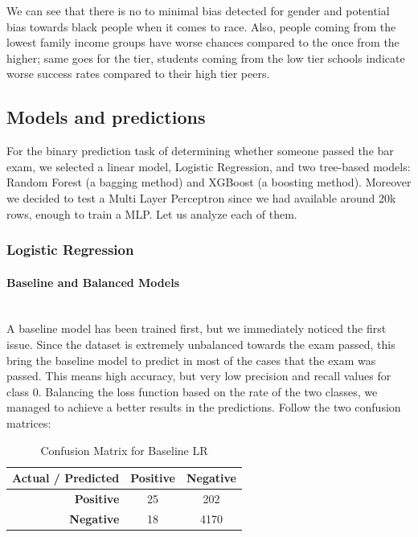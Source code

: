 \documentclass{article}
\begin{document}
We can see that there is no to minimal bias detected for gender and potential bias towards black people when it comes to race. Also, people coming from the lowest family income groups have worse chances compared to the once from the higher; same goes for the tier, students coming from the low tier schools indicate worse success rates compared to their high tier peers.
\subsection{Models and predictions}
For the binary prediction task of determining whether someone passed the bar exam, we selected a linear model, Logistic Regression, and two tree-based models: Random Forest (a bagging method) and XGBoost (a boosting method). Moreover we decided to test a Multi Layer Perceptron since we had available around 20k rows, enough to train a MLP. Let us analyze each of them.
\subsubsection{Logistic Regression}
\paragraph{Baseline and Balanced Models}\mbox{}\\
A baseline model has been trained first, but we immediately noticed the first issue. Since the dataset is extremely unbalanced towards the exam passed, this bring the baseline model to predict in most of the cases that the exam was passed. This means high accuracy, but very low precision and recall values for class 0. Balancing the loss function based on the rate of the two classes, we managed to achieve a better results in the predictions. Follow the two confusion matrices:
\begin{table}[h!]
\centering
\caption{Confusion Matrix for Baseline LR}
\label{tab:confusion_matrix1}
\begin{tabular}{r|cc}
\toprule
\textbf{Actual / Predicted} & \textbf{Positive} & \textbf{Negative} \\
\midrule
\textbf{Positive} & 25 & 202 \\
\textbf{Negative} & 18 & 4170\\
\bottomrule
\end{tabular}
\end{table}
\end{document}
